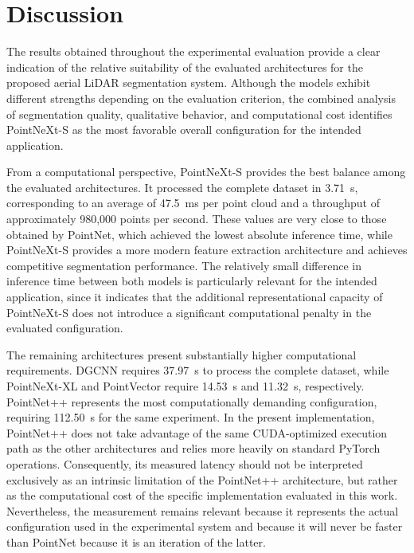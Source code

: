 \section{Discussion}
\label{sec:discussion}

The results obtained throughout the experimental evaluation provide a clear indication of the relative suitability of the evaluated architectures for the proposed aerial LiDAR segmentation system. Although the models exhibit different strengths depending on the evaluation criterion, the combined analysis of segmentation quality, qualitative behavior, and computational cost identifies PointNeXt-S as the most favorable overall configuration for the intended application.

From a computational perspective, PointNeXt-S provides the best balance among the evaluated architectures. It processed the complete dataset in 3.71~s, corresponding to an average of 47.5~ms per point cloud and a throughput of approximately 980,000 points per second. These values are very close to those obtained by PointNet, which achieved the lowest absolute inference time, while PointNeXt-S provides a more modern feature extraction architecture and achieves competitive segmentation performance. The relatively small difference in inference time between both models is particularly relevant for the intended application, since it indicates that the additional representational capacity of PointNeXt-S does not introduce a significant computational penalty in the evaluated configuration.

The remaining architectures present substantially higher computational requirements. DGCNN requires 37.97~s to process the complete dataset, while PointNeXt-XL and PointVector require 14.53~s and 11.32~s, respectively. PointNet++ represents the most computationally demanding configuration, requiring 112.50~s for the same experiment. In the present implementation, PointNet++ does not take advantage of the same CUDA-optimized execution path as the other architectures and relies more heavily on standard PyTorch operations. Consequently, its measured latency should not be interpreted exclusively as an intrinsic limitation of the PointNet++ architecture, but rather as the computational cost of the specific implementation evaluated in this work. Nevertheless, the measurement remains relevant because it represents the actual configuration used in the experimental system and because it will never be faster than PointNet because it is an iteration of the latter.

